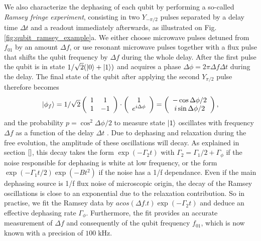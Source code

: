 We also characterize the dephasing of each qubit by performing a so-called {\it Ramsey fringe experiment}, consisting in two $Y_{-\pi/2}$ pulses separated by a delay time ${\Delta}t$ and a readout immediately afterwards, as illustrated  on Fig. \ref{fig:qubit_ramsey_example}a. We either choose microwave pulses detuned from $f_{01}$ by an amount ${\Delta}f$, or use resonant microwave pulses together with a flux pulse that shifts the qubit frequency by ${\Delta}f$ during the whole delay. After the first pulse the qubit is in state $1/\sqrt{2}(\left| 0 \right>+\left| 1 \right>)$ and acquires  a phase  $\Delta \phi = 2\pi\Delta f \Delta t$ during the delay. The final state of the qubit after applying the second $Y_{\pi/2}$ pulse therefore becomes
%
\begin{equation}
\left| \phi_f \right> =1/\sqrt{2} \left(\begin{array}{cc} 1 & 1 \\ 1 & -1 \end{array} \right)\cdot\left(\begin{array}{c} 1 \\ e^{i\Delta\phi} \end{array}\right) = \left( \begin{array}{c}  -\cos{\Delta\phi/2} \\ i\sin{\Delta\phi/2} \end{array}\right),
\end{equation}
%
and the probability $p=\cos^2{\Delta\phi/2}$ to measure state $\left| 1 \right>$ oscillates with frequency $\Delta f$ as a function of the delay ${\Delta}t$ . Due to dephasing and relaxation during the free evolution, the amplitude of these oscillations will decay. As explained in section $\ref{}$, this decay takes the form $\exp{(-\Gamma_2 t)}$ with $\Gamma_2=\Gamma_1/2 +\Gamma_{\phi}$ if the noise responsible for dephasing is white at low frequency, or the form $\exp{(-\Gamma_1 t/2 )}\exp{(-B t^2)}$ if the noise has a 1/f dependance. Even if the main dephasing source is 1/f flux noise of microscopic origin, the decay of the Ramsey oscillations is close to an exponential due to the relaxation contribution. So in practise, we fit the Ramsey data by $a cos({\Delta}f.t)\exp{(-\Gamma_2 t)}$ and deduce an effective dephasing rate $\Gamma_{\phi}$.
Furthermore, the fit provides an accurate measurement of ${\Delta}f$ and consequently of the qubit frequency $f_{01}$, which is now known with a precision of $100\;\mathrm{kHz}$. 

